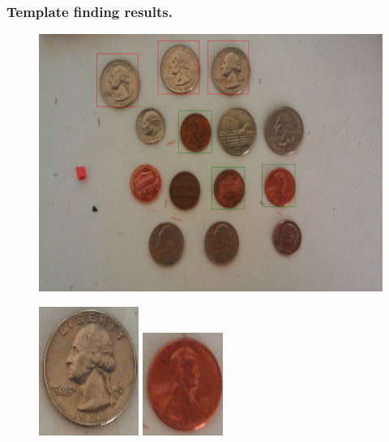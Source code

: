 \documentclass{beamer}
\begin{document}
\begin{frame}
\frametitle{Template finding results.}
 \begin{figure}
     \includegraphics[width=0.4\linewidth]{foundtemplates.png}
 \end{figure}
 \begin{figure}
     \includegraphics[width=0.1\linewidth]{template1.png}
     \quad
     \includegraphics[width=0.1\linewidth]{template2.png}
 \end{figure}
\end{frame}
\end{document}
